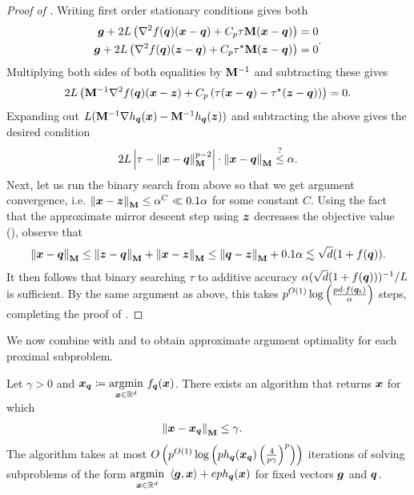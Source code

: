 \begin{proof}[Proof of ]
Writing first order stationary conditions gives both
\begin{equation*}
    \begin{aligned}
        \bm{g} + 2L\left(\nabla^2 f(\bm{q})(\bm{x}-\bm{q})+C_p\tau\mathbf{M}(\bm{x}-\bm{q})\right) &= 0 \\
        \bm{g} + 2L\left(\nabla^2 f(\bm{q})(\bm{z}-\bm{q})+C_p\tau^{\star}\mathbf{M}(\bm{z}-\bm{q})\right) &= 0
    \end{aligned}.
\end{equation*}
Multiplying both sides of both equalities by $\mathbf{M}^{-1}$ and subtracting these gives
\begin{align*}
    2L\left(\mathbf{M}^{-1}\nabla^2 f(\bm{q})(\bm{x}-\bm{z}) + C_p\left(\tau(\bm{x}-\bm{q})-\tau^{\star}(\bm{z}-\bm{q})\right)\right) = 0.
\end{align*}
Expanding out $L(\mathbf{M}^{-1}\nabla h_{\bm{q}}(\bm{x})-\mathbf{M}^{-1}h_{\bm{q}}(\bm{z}))$ and subtracting the above gives the desired condition
\begin{align*}
    2L\left\lvert \tau-\left\lVert \bm{x}-\bm{q} \right\rVert_{\mathbf{M}}^{p-2} \right\rvert \cdot \left\lVert \bm{x}-\bm{q} \right\rVert_{\mathbf{M}} \overset{?}{\le} \alpha.
\end{align*}
Next, let us run the binary search from above so that we get argument convergence, i.e. $\left\lVert \bm{x}-\bm{z} \right\rVert_{\mathbf{M}} \le \alpha^C \ll 0.1\alpha$ for some constant $C$. Using the fact that the approximate mirror descent step using $\bm{z}$ decreases the objective value (), observe that
\begin{align*}
    \left\lVert \bm{x}-\bm{q} \right\rVert_{\mathbf{M}} \le \left\lVert \bm{z}-\bm{q} \right\rVert_{\mathbf{M}} + \left\lVert \bm{x}-\bm{z} \right\rVert_{\mathbf{M}} \le \left\lVert \bm{q}-\bm{z} \right\rVert_{\mathbf{M}}+0.1\alpha \lesssim \sqrt{d}(1+f(\bm{q})). 
\end{align*}
It then follows that binary searching $\tau$ to additive accuracy $\alpha(\sqrt{d}(1+f(\bm{q})))^{-1}/L$ is sufficient. By the same argument as above, this takes $p^{O(1)}\log\left(\frac{pd \cdot f(\bm{q}_t)}{\alpha}\right)$ steps, completing the proof of .
\end{proof}
We now combine  with  and  to obtain approximate argument optimality for each proximal subproblem.
\begin{lemma}
\label{lemma:prox_subproblem_base}
Let $\gamma > 0$ and $\bm{x}_{\bm{q}} \coloneqq \underset{\bm{x}\in\mathbb{R}^d}{\mathrm{argmin}}\  f_{\bm{q}}(\bm{x})$. There exists an algorithm that returns $\bm{x}$ for which
\begin{align*}
    \left\lVert \bm{x}-\bm{x}_{\bm{q}} \right\rVert_{\mathbf{M}} &\le \gamma.
\end{align*}
The algorithm takes at most $O\left(p^{O(1)}\log\left(ph_{\bm{q}}(\bm{x}_{\bm{q}})\left(\frac{4}{p\gamma}\right)^{p}\right)\right)$ iterations of solving subproblems of the form $\underset{\bm{x}\in\mathbb{R}^d}{\mathrm{argmin}}\  \left\langle \bm{g},\bm{x} \right\rangle+eph_{\bm{q}}(\bm{x})$ for fixed vectors $\bm{g}$ and $\bm{q}$.
\end{lemma}
